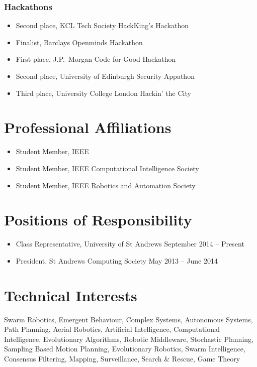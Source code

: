 \documentclass[line,margin]{cv}
\begin{document}
\begin{resume}
\begin{itemize}
\end{itemize}

\subsubsection{Hackathons}

\begin{itemize}

    \item Second place, KCL Tech Society HackKing's Hackathon
    \item Finalist, Barclays Openminds Hackathon
    \item First place, J.P.\ Morgan Code for Good Hackathon
    \item Second place, University of Edinburgh Security Appathon
    \item Third place, University College London Hackin' the City

\end{itemize}

\section{Professional Affiliations}

\begin{itemize}

    \item Student Member, IEEE
    \item Student Member, IEEE Computational Intelligence Society
    \item Student Member, IEEE Robotics and Automation Society

\end{itemize}

\section{Positions of Responsibility}

\begin{itemize}

    \item Class Representative, University of St Andrews
        \hfill September 2014 -- Present
    \item President, St Andrews Computing Society
        \hfill May 2013 -- June 2014

\end{itemize}

\section{Technical Interests}
    Swarm Robotics, Emergent Behaviour, Complex Systems, Autonomous
    Systems, Path Planning, Aerial Robotics, Artificial Intelligence,
    Computational Intelligence, Evolutionary Algorithms, Robotic Middleware,
    Stochastic Planning, Sampling Based Motion Planning, Evolutionary Robotics,
    Swarm Intelligence, Consensus Filtering, Mapping, Surveillance, Search \&
    Rescue, Game Theory


\end{resume}
\end{document}
